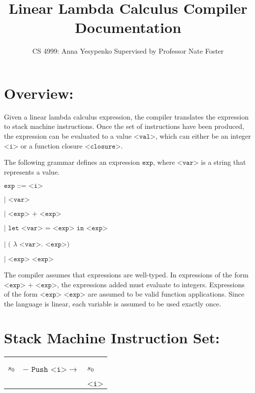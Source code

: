 \documentclass[11pt]{article}
\begin{document}
\title{Linear Lambda Calculus Compiler Documentation}
\author{CS 4999: Anna Yesypenko Supervised by Professor Nate Foster}
\maketitle

\section*{Overview:}

Given a linear lambda calculus expression, the compiler translates the expression to stack machine instructions. Once the set of instructions have been produced, the expression can be evaluated to a value $\texttt{<val>}$, which can either be an integer $\texttt{<i>}$ or a function closure $\texttt{<closure>}$. 

\medskip
The following grammar defines an expression $\texttt{exp}$, where $\texttt{<var>}$ is a string that represents a value.

\vspace{5mm}

$\texttt{exp ::= <i>}$

\hspace{12 mm} $\texttt {| <var>}$ 

\hspace{12 mm} $\texttt {| <exp> + <exp>}$ 

\hspace{12 mm} $\texttt{| let <var> = <exp> in <exp>}$

\hspace{12 mm} $\texttt {| (}$ $\lambda$ $\texttt{<var>. <exp>)}$ 

\hspace{12 mm} $\texttt{| <exp> <exp>}$

\vspace{5mm}

The compiler assumes that expressions are well-typed. In expressions of the form $\texttt {<exp> + <exp>}$, the expressions added must evaluate to integers. Expressions of the form $\texttt{<exp> <exp>}$ are assumed to be valid function applications. Since the language is linear, each variable is assumed to be used exactly once.

\section*{Stack Machine Instruction Set:}

\begin{center}
  \begin{tabular}{|P{2.5cm}|P{2.5cm}|P{2.5cm}|}
     
    &&\\ 
    &&\\
    &&\\
    $s_0$ & $- \texttt{  Push <i>} \rightarrow$ & $s_0$ \\
    &&\\
    &&\\ 
    && $\texttt{<i>}$ \\
     
  \end{tabular}
\end{center}
\end{document}
